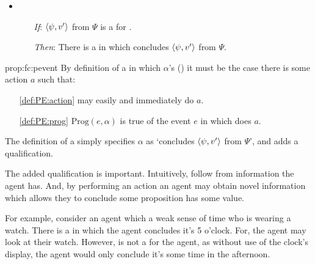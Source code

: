 \begin{note}[\fc{2} definition]
  \begin{proposition}%
    \label{prop:fc:pevent}%
    \begin{itemize}
    \item
      \begin{itemize}
      \item[\emph{If}:]
        \(\langle \psi, v' \rangle\) from \(\Psi\) is a \emph{} for \vAgent{}.
      \item[\emph{Then}:]
        There is a \pevent{} in which \vAgent{} concludes \(\langle \psi, v' \rangle\) from \(\Psi\).
      \end{itemize}
    \end{itemize}
    \vspace{-\baselineskip}
  \end{proposition}

  \begin{argument}{prop:fc:pevent}
    By definition of a \pevent{} in which \vAgent{} \(\alpha\)'s (\peventpage{}) it must be the case there is some action \(a\) such that:
    \begin{enumerate}[noitemsep]
    \item[\ref{def:PE:action}]
      \vAgent{} may easily and immediately do \(a\).
    \item[\ref{def:PE:prog}]
      \(\text{Prog}(e, \alpha)\) is true of the event \(e\) in which \vAgent{} does \(a\).
    \end{enumerate}
    The definition of a \fc{} simply specifies \(\alpha\) as `concludes \(\langle \psi, v' \rangle\) from \(\Psi\)', and adds a qualification.
  \end{argument}

  The added qualification is important.
  Intuitively,  follow from information the agent has.
  And, by performing an action an agent may obtain novel information which allows they to conclude some proposition has some value.

  For example, consider an agent which a weak sense of time who is wearing a watch.
  There is a \pevent{} in which the agent concludes it's 5 o'clock.
  For, the agent may look at their watch.
  However,  is not a \fc{} for the agent, as without use of the clock's display, the agent would only conclude it's some time in the afternoon.
\end{note}

